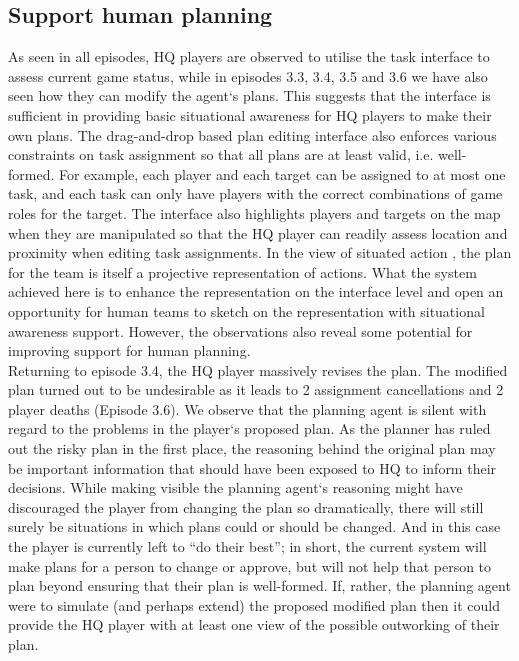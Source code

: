 \subsection{Support human planning} \label{sec:study3supportPlanning}
As seen in all episodes, HQ players are observed to utilise the task interface to assess current game status, while in episodes 3.3, 3.4, 3.5 and 3.6 we have also seen how they can modify the agent`s plans. This suggests that the interface is sufficient in providing basic situational awareness for HQ players to make their own plans. The drag-and-drop based plan editing interface also enforces various constraints on task assignment so that all plans are at least valid, i.e. well-formed. For example, each player and each target can be assigned to at most one task, and each task can only have players with the correct combinations of game roles for the target. The interface also highlights players and targets on the map when they are manipulated so that the HQ player can readily assess location and proximity when editing task assignments. In the view of situated action \cite{Suchman1987}, the plan for the team is itself a projective representation of actions. What the system achieved here is to enhance the representation on the interface level and open an opportunity for human teams to sketch on the representation with situational awareness support. However, the observations also reveal some potential for improving support for human planning.\\

Returning to episode 3.4, the HQ player massively revises the plan. The modified plan turned out to be undesirable as it leads to 2 assignment cancellations and 2 player deaths (Episode 3.6).  We observe that the planning agent is silent with regard to the problems in the player`s proposed plan. As the planner has ruled out the risky plan in the first place, the reasoning behind the original plan may be important information that should have been exposed to HQ to inform their decisions. While making visible the planning agent`s reasoning might have discouraged the player from changing the plan so dramatically, there will still surely be situations in which plans could or should be changed. And in this case the player is currently left to ``do their best''; in short, the current system will make plans for a person to change or approve, but will not help that person to plan beyond ensuring that their plan is well-formed. If, rather, the planning agent were to simulate (and perhaps extend) the proposed modified plan then it could provide the HQ player with at least one view of the possible outworking of their plan.\\


